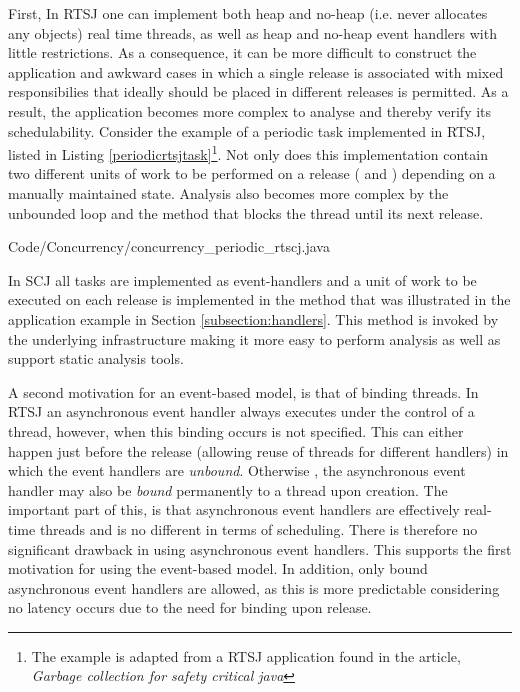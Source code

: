 First, In RTSJ one can implement both heap and no-heap (i.e. never allocates any objects) real time threads, as well as heap and no-heap event handlers with little restrictions. As a consequence, it can be more difficult to construct the application and awkward cases in which a single release is associated with mixed responsibilies that ideally should be placed in different releases is permitted. As a result, the application becomes more complex to analyse and thereby verify its schedulability. Consider the example of a periodic task implemented in RTSJ, listed in Listing \ref{periodicrtsjtask}\footnote{The example is adapted from a RTSJ application found in the article, \textit{Garbage collection for safety critical java}\cite{Schoeberl:2007:GCS:1288940.1288953}}. Not only does this implementation contain two different units of work to be performed on a release ( and ) depending on a manually maintained state. Analysis also becomes more complex by the unbounded loop and the  method that blocks the thread until its next release.


{Code/Concurrency/concurrency_periodic_rtscj.java}

In SCJ all tasks are implemented as event-handlers and a unit of work to be executed on each release is implemented in the  method that was illustrated in the application example in Section \ref{subsection:handlers}. This method is invoked by the underlying infrastructure making it more easy to perform analysis as well as support static analysis tools.

A second motivation for an event-based model, is that of binding threads. In RTSJ an asynchronous event handler always executes under the control of a thread, however, when this binding occurs is not specified. This can either happen just before the release (allowing reuse of threads for different handlers) in which the event handlers are \textit{unbound}. Otherwise , the asynchronous event handler may also be \textit{bound} permanently to a thread upon creation. The important part of this, is that asynchronous event handlers are effectively real-time threads and is no different in terms of scheduling. There is therefore no significant drawback in using asynchronous event handlers. This supports the first motivation for using the event-based model. In addition, only bound asynchronous event handlers are allowed, as this is more predictable considering no latency occurs due to the need for binding upon release.

